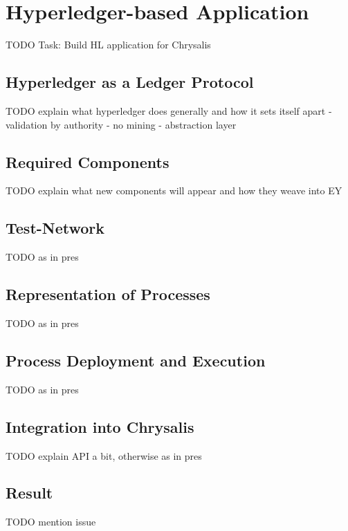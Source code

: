 %
\section{Hyperledger-based Application}
\label{sec:impr:hl}

TODO Task: Build HL application for Chrysalis

\subsection{Hyperledger as a Ledger Protocol}
\label{sec:impr:hl:basics}

TODO explain what hyperledger does generally and how it sets itself apart
- validation by authority - no mining - abstraction layer

\subsection{Required Components}
\label{sec:impr:hl:requirements}

TODO explain what new components will appear and how they weave into EY

\subsection{Test-Network}
\label{sec:impr:hl:network}

TODO as in pres

\subsection{Representation of Processes}
\label{sec:impr:hl:datastructure}

TODO as in pres

\subsection{Process Deployment and Execution}
\label{sec:impr:hl:chaincode}

TODO as in pres

\subsection{Integration into Chrysalis}
\label{sec:impr:hl:integration}

TODO explain API a bit, otherwise as in pres

\subsection{Result}
\label{sec:impr:hl:result}

TODO mention issue